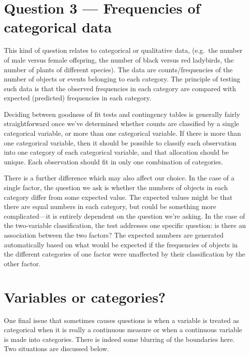 \documentclass[
]{book}
\begin{document}
\hypertarget{qu4}{%
\section{Question 3 --- Frequencies of categorical data}\label{qu4}}

This kind of question relates to categorical or qualitative data, (e.g.~the number of male versus female offspring, the number of black versus red ladybirds, the number of plants of different species). The data are counts/frequencies of the number of objects or events belonging to each category. The principle of testing such data is that the observed frequencies in each category are compared with expected (predicted) frequencies in each category.

Deciding between goodness of fit tests and contingency tables is generally fairly straightforward once we've determined whether counts are classified by a single categorical variable, or more than one categorical variable. If there is more than one categorical variable, then it should be possible to classify each observation into one category of each categorical variable, and that allocation should be unique. Each observation should fit in only one combination of categories.

There is a further difference which may also affect our choice. In the case of a single factor, the question we ask is whether the numbers of objects in each category differ from some expected value. The expected values might be that there are equal numbers in each category, but could be something more complicated---it is entirely dependent on the question we're asking. In the case of the two-variable classification, the test addresses one specific question: is there an association between the two factors? The expected numbers are generated automatically based on what would be expected if the frequencies of objects in the different categories of one factor were unaffected by their classification by the other factor.

\hypertarget{var-cat}{%
\section{Variables or categories?}\label{var-cat}}

One final issue that sometimes causes questions is when a variable is treated as categorical when it is really a continuous measure or when a continuous variable is made into categories. There is indeed some blurring of the boundaries here. Two situations are discussed below.
\end{document}
